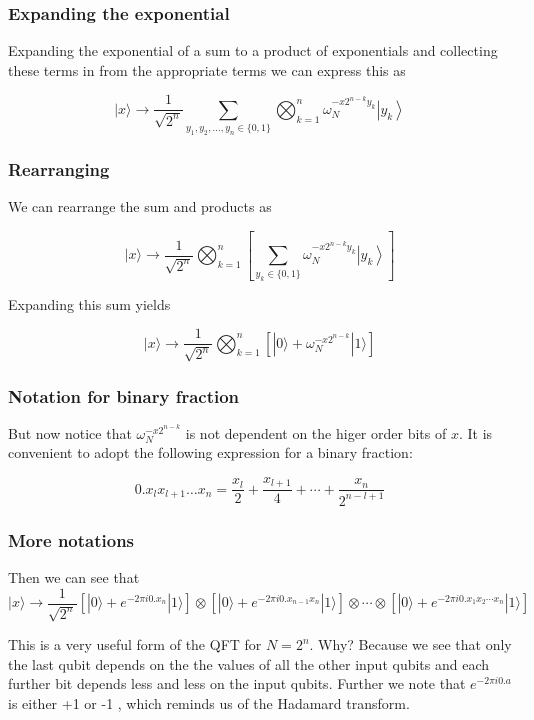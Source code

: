 \documentclass{beamer}
\begin{document}
\begin{frame}
\frametitle{Expanding the exponential}

Expanding the exponential of a sum to a product of exponentials and
collecting these terms in from the appropriate terms we can express
this as

\begin{equation*}
|x\rangle \rightarrow \frac{1}{\sqrt{2^{n}}} \sum_{y_{1}, y_{2}, \ldots, y_{n} \in\{0,1\}} \bigotimes_{k=1}^{n} \omega_{N}^{-x 2^{n-k} y_{k}}\left|y_{k}\right\rangle 
\end{equation*}
\end{frame}

\begin{frame}
\frametitle{Rearranging}

We can rearrange the sum and products as

\begin{equation*}
|x\rangle \rightarrow \frac{1}{\sqrt{2^{n}}} \bigotimes_{k=1}^{n}\left[\sum_{y_{k} \in\{0,1\}} \omega_{N}^{-x 2^{n-k} y_{k}}\left|y_{k}\right\rangle\right] 
\end{equation*}

Expanding this sum yields

\begin{equation*}
|x\rangle \rightarrow \frac{1}{\sqrt{2^{n}}} \bigotimes_{k=1}^{n}\left[|0\rangle+\omega_{N}^{-x 2^{n-k}}|1\rangle\right]
\end{equation*}
\end{frame}

\begin{frame}
\frametitle{Notation for binary fraction}

But now notice that $\omega_{N}^{-x 2^{n-k}}$ is not dependent on the
higer order bits of $x$. It is convenient to adopt the following
expression for a binary fraction:

\begin{equation*}
0 . x_{l} x_{l+1} \ldots x_{n}=\frac{x_{l}}{2}+\frac{x_{l+1}}{4}+\cdots+\frac{x_{n}}{2^{n-l+1}}
\end{equation*}
\end{frame}

\begin{frame}
\frametitle{More notations}

Then we can see that
\begin{equation*}
|x\rangle \rightarrow \frac{1}{\sqrt{2^{n}}}\left[|0\rangle+e^{-2 \pi i 0 . x_{n}}|1\rangle\right] \otimes\left[|0\rangle+e^{-2 \pi i 0 . x_{n-1} x_{n}}|1\rangle\right] \otimes \cdots \otimes\left[|0\rangle+e^{-2 \pi i 0 . x_{1} x_{2} \cdots x_{n}}|1\rangle\right] 
\end{equation*}

This is a very useful form of the QFT for $N=2^{n}$. Why? Because we
see that only the last qubit depends on the the values of all the
other input qubits and each further bit depends less and less on the
input qubits. Further we note that $e^{-2 \pi i 0 . a}$ is either +1
or -1 , which reminds us of the Hadamard transform.
\end{frame}
\end{document}
